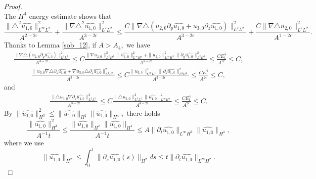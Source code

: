\documentclass[12pt, reqno]{amsart}
\numberwithin{equation}{section}
\begin{document}
\begin{proof}
\begin{equation}
		\end{equation}
		The $H^4$ energy estimate shows that 
		\begin{equation}\label{u_1_temp}
			\frac{\|\triangle^2\widehat{u_{1,0}}\|^2_{L^{\infty}L^2}}{A^{2-2\epsilon}}+\frac{\|\nabla\triangle^2\widehat{u_{1,0}}\|^2_{L^{2}L^2}}{A^{3-2\epsilon}}
			\leq 
			\frac{C\|\nabla\triangle(u_{2,0}\partial_y\widehat{u_{1,0}}
				+u_{3,0}\partial_z\widehat{u_{1,0}})\|^2_{L^{2}L^2}}{A^{3-2\epsilon}}
			+\frac{C\|\nabla\triangle u_{2,0}\|^2_{L^{2}L^2}}{A^{1-2\epsilon}}.	
		\end{equation}
		Thanks to Lemma \ref{sob_12}, if $A>A_4,$ we have 
		\begin{equation}
			\begin{aligned}
				\frac{\|\nabla\triangle(u_{2,0}\partial_y\widehat{u_{1,0}})\|^2_{L^{2}L^2}}{A^{3-2\epsilon}}
				\leq C
				\frac{\|\nabla u_{2,0}\|^2_{L^{2}H^2}\|\widehat{u_{1,0}}\|^2_{L^{\infty}H^4}+\|u_{2,0}\|^2_{L^{\infty}H^2}\|\partial_y\widehat{u_{1,0}}\|^2_{L^{2}H^3}}{A^{3-2\epsilon}}
				\leq \frac{CE_1^4}{A^{2\epsilon}}\leq C,
			\end{aligned}
		\end{equation}
		\begin{equation}
			\begin{aligned}
				\frac{\|u_{3,0}\nabla\triangle\partial_z\widehat{u_{1,0}}+\nabla u_{3,0}\triangle\partial_z\widehat{u_{1,0}}\|^2_{L^{2}L^2}}{A^{3-2\epsilon}}
				\leq C
				\frac{\|u_{3,0}\|^2_{L^{\infty}H^1}
					\|\partial_z\widehat{u_{1,0}}\|^2_{L^{2}H^4}}{A^{3-2\epsilon}}
				\leq \frac{CE_1^4}{A^{2\epsilon}}\leq C,
			\end{aligned}
		\end{equation}
		and
		\begin{equation}
			\begin{aligned}
				\frac{\|\triangle u_{3,0}
					\nabla\partial_z\widehat{u_{1,0}}\|^2_{L^{2}L^2}}{A^{3-2\epsilon}}
				\leq C
				\frac{\|\triangle u_{3,0}\|^2_{L^{2}L^2}
					\|\widehat{u_{1,0}}\|^2_{L^{\infty}H^4}}{A^{3-2\epsilon}}
				\leq \frac{CE_1^4}{A^{2\epsilon}}\leq C.
			\end{aligned}
		\end{equation}
		By $\|\widehat{u_{1,0}}\|^2_{H^3}\leq \|\widehat{u_{1,0}}\|_{H^2}
		\|\widehat{u_{1,0}}\|_{H^4},$ there holds
		$$\frac{\|\widehat{u_{1,0}}\|^2_{H^3}}{A^{-1}t}\leq \frac{\|\widehat{u_{1,0}}\|_{H^2}\|\widehat{u_{1,0}}\|_{H^4}}{A^{-1}t}
		\leq A\|\partial_t\widehat{u_{1,0}}\|_{L^{\infty}H^2}
		\|\widehat{u_{1,0}}\|_{H^4},$$
		where we use
		$$\|\widehat{u_{1,0}}\|_{H^2}\leq \int_0^t \|\partial_s\widehat{u_{1,0}}(s)\|_{H^2}ds\leq t\|\partial_t\widehat{u_{1,0}}\|_{L^{\infty}H^2}.$$

\end{proof}
\end{document}
